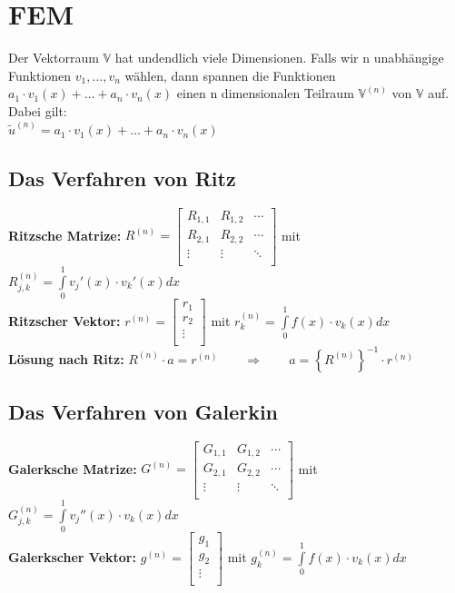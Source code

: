 \section{FEM}

Der Vektorraum $\mathbb{V}$ hat undendlich viele Dimensionen. Falls wir n unabhängige Funktionen $v_1,\ldots,v_n$ wählen, dann spannen die Funktionen $a_1\cdot v_1(x)+\ldots+a_n\cdot v_n(x)$ einen n dimensionalen Teilraum $\mathbb{V}^{(n)}$  von $\mathbb{V}$ auf. Dabei gilt:\\

$\boxed{\tilde{u}^{(n)}=a_1\cdot v_1(x)+\ldots+a_n\cdot v_n(x)}$
\subsection{Das Verfahren von Ritz}
\textbf{Ritzsche Matrize: }
$R^{(n)}=\begin{bmatrix}
	R_{1,1}& R_{1,2}&\cdots\\
	R_{2,1}& R_{2,2}&\cdots\\
	\vdots & \vdots &\ddots\\
\end{bmatrix}$ \qquad mit \qquad $R_{j,k}^{(n)}=\int\limits_{0}^{1}{v_j'(x)\cdot
v_k'(x) dx}$\\
\textbf{Ritzscher Vektor: } 
$r^{(n)}=\begin{bmatrix}
	r_1\\
	r_2\\
	\vdots\\
\end{bmatrix}$ \qquad mit \qquad $r_{k}^{(n)}=\int\limits_{0}^{1}{f(x)\cdot v_k(x) dx}$\\

\textbf{Lösung nach Ritz:} $R^{(n)}\cdot a=r^{(n)}\qquad \Rightarrow \qquad a=\left\{R^{(n)}\right\}^{-1}\cdot r^{(n)}$
\subsection{Das Verfahren von Galerkin}
\textbf{Galerksche Matrize: }
$G^{(n)}=\begin{bmatrix}
	G_{1,1}& G_{1,2}&\cdots\\
	G_{2,1}& G_{2,2}&\cdots\\
	\vdots & \vdots &\ddots\\
\end{bmatrix}$ \qquad mit \qquad $G_{j,k}^{(n)}=\int\limits_{0}^{1}{v_j''(x)\cdot v_k(x) dx}$\\
\textbf{Galerkscher Vektor: } 
$g^{(n)}=\begin{bmatrix}
	g_1\\
	g_2\\
	\vdots\\
\end{bmatrix}$ \qquad mit \qquad $g_{k}^{(n)}=\int\limits_{0}^{1}{f(x)\cdot v_k(x) dx}$\\

